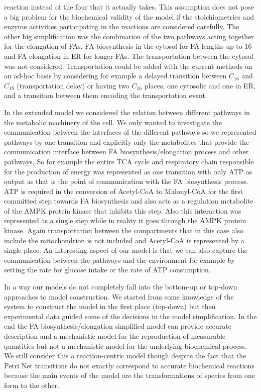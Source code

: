 reaction instead of the four that it actually takes. This assumption does not pose a big problem for the
biochemical validity of the model if the stoichiometries and enzyme
activities participating in the reactions are considered
carefully. The other big simplification was the combination of the two
pathways acting together for the elongation of FAs, FA biosynthesis in
the cytosol
for FA lengths up to 16 and FA elongation in ER for longer FAs. The
transportation between the cytosol was not considered. Transportation
could be added with the current methods on an ad-hoc basis by
considering for example a delayed transition between $C_{16}$ and
$C_{18}$ (transportation delay) or having two $C_{16}$ places, one
cytosolic and one in ER, and a transition between them encoding the
transportation event.

In the extended model we considered the relation between different
pathways in the metabolic machinery of the cell. We only wanted to
investigate the communication between the interfaces of the different
pathways so we represented pathways by one transition and explicitly
only the metabolites that provide the communication interface between FA biosynthesis/elongation process and
other pathways. So for example the entire TCA cycle and respiratory chain
responsible for the production of energy was represented as one transition with
only ATP as output as that is the point of
communication with the FA biosynthesis process. ATP is required in the
conversion of Acetyl-CoA to Malonyl-CoA for the first committed step
towards FA biosynthesis and also acts as a regulation metabolite of
the AMPK protein kinase that inhibits this step. Also this interaction
was represented as a single step while in reality it goes through the
AMPK protein kinase. Again transportation between the compartments
that in this case also include the mitochondrion is not included and
Acetyl-CoA is represented by a single place. An interesting aspect of
our model is that we can also capture the communication between the
pathways and the environment for example by setting the rate for
glucose intake or the rate of ATP consumption.

In a way our models do not completely fall into the bottom-up or
top-down approaches to model construction. We started from some
knowledge of the system to construct the model in the first place
(top-down) but then experimental data guided some of the decisions in
the model simplification. In the end the FA biosynthesis/elongation
simplified model can provide accurate description and a mechanistic model for the reproduction of
measurable quantities but not a mechanistic model for the underlying
biochemical process. We still consider this a reaction-centric model
though despite the fact that the Petri Net transitions do not exactly
correspond to accurate biochemical reactions because the main events of the model are the
transformations of species from one form to the other.

